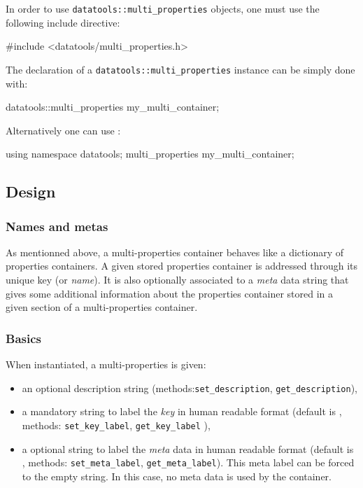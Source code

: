 \pn  In   order  to  use  \texttt{datatools::multi\_properties}
objects, one must use the following include directive:
\begin{CppVerbatim}
#include <datatools/multi_properties.h>
\end{CppVerbatim}

\pn The  declaration of a \texttt{datatools::multi\_properties}
instance can be simply done with:
\begin{CppVerbatim}
datatools::multi_properties my_multi_container;
\end{CppVerbatim}
Alternatively one can use :
\begin{CppVerbatim}
using namespace datatools;
multi_properties my_multi_container;
\end{CppVerbatim}

\subsection{Design}

\subsubsection{Names and metas}

\pn As  mentionned above, a multi-properties container  behaves like a
dictionary  of  properties  containers.   A  given  stored  properties
container is addressed through its unique key (or \emph{name}).  It is
also  optionally associated to  a \emph{meta}  data string  that gives
some additional information about the properties container stored in a
given section of a multi-properties container.

\subsubsection{Basics}

\pn When instantiated, a multi-properties is given:
\begin{itemize}

\item          an         optional          description         string
  (methods:\texttt{set\_description}, \texttt{get\_description}),

\item a  mandatory string  to label the  \emph{key} in  human readable
  format  (default  is  , methods:  \texttt{set\_key\_label},
  \texttt{get\_key\_label} ),

\item  a  optional string  to  label  the  \emph{meta} data  in  human
  readable     format      (default     is     ,     methods:
  \texttt{set\_meta\_label},   \texttt{get\_meta\_label}).  This  meta
  label can be forced to the empty string.  In this case, no meta data
  is used by the container.

\end{itemize}

